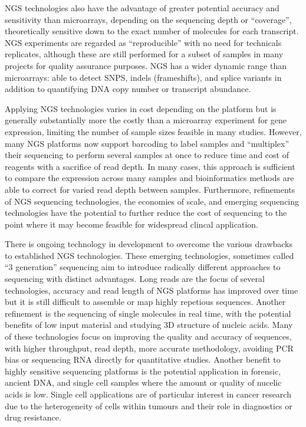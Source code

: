 NGS technologies also have the advantage of greater potential accuracy and sensitivity than microarrays, depending on the sequencing depth or ``coverage'', theoretically sensitive down to the exact number of molecules for each transcript. NGS experiments are regarded as ``reproducible'' with no need for technicals replicates, although these are still performed for a subset of samples in many projects for quality assurance purposes. NGS has a wider dynamic range than microarrays: able to detect SNPS, indels (frameshifts), and splice variants in addition to quantifying DNA copy number or transcript abundance.

Applying NGS technologies varies in cost depending on the platform but is generally substantially more the costly than a microarray experiment for gene expression, limiting the number of sample sizes feasible in many studies.  However, many NGS platforms now support barcoding to label samples and ``multiplex'' their sequencing to perform several samples at once to reduce time and cost of reagents with a sacrifice of read depth. In many cases, this approach is sufficient to compare the expression across many samples and bioinformatics methods are able to correct for varied read depth between samples. Furthermore, refinements of NGS sequencing technologies, the economies of scale, and emerging sequencing technologies have the potential to further reduce the cost of sequencing to the point where it may become feasible for widespread clincal application.  

There is ongoing technology in development to overcome the various drawbacks to established NGS technologies. These emerging technologies, sometimes called ``3 generation'' sequencing aim to introduce radically different approaches to sequencing with distinct advantages. Long reads are the focus of several technologies, accuracy and read length of NGS platforms has improved over time but it is still difficult to assemble or map highly repetious sequences. Another refinement is the sequencing of single molecules in real time, with the potential benefits of low input material and studying 3D structure of nucleic acids. Many of these technologies focus on improving the quality and accuracy of sequences, with higher throughput, read depth, more accurate methodology, avoiding PCR bias or sequencing RNA directly for quantitative studies. Another benefit to highly sensitive sequencing platforms is the potential application in forensic, ancient DNA, and single cell samples where the amount or quality of nucelic acids is low. Single cell applications are of particular interest in cancer research due to the heterogeneity of cells within tumours and their role in diagnostics or drug resistance.

